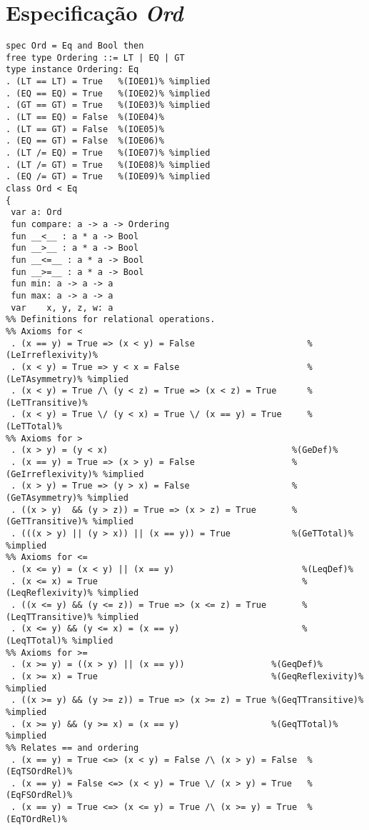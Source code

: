 \section{Especificação \textit{Ord}}
\label{appendix:strictSpec:ord}
\begin{Verbatim}
spec Ord = Eq and Bool then
free type Ordering ::= LT | EQ | GT
type instance Ordering: Eq
. (LT == LT) = True   %(IOE01)% %implied
. (EQ == EQ) = True   %(IOE02)% %implied
. (GT == GT) = True   %(IOE03)% %implied
. (LT == EQ) = False  %(IOE04)%
. (LT == GT) = False  %(IOE05)%
. (EQ == GT) = False  %(IOE06)%
. (LT /= EQ) = True   %(IOE07)% %implied
. (LT /= GT) = True   %(IOE08)% %implied
. (EQ /= GT) = True   %(IOE09)% %implied
class Ord < Eq
{
 var a: Ord
 fun compare: a -> a -> Ordering
 fun __<__ : a * a -> Bool
 fun __>__ : a * a -> Bool
 fun __<=__ : a * a -> Bool
 fun __>=__ : a * a -> Bool
 fun min: a -> a -> a
 fun max: a -> a -> a
 var    x, y, z, w: a
%% Definitions for relational operations.
%% Axioms for <
 . (x == y) = True => (x < y) = False                      %(LeIrreflexivity)%
 . (x < y) = True => y < x = False                         %(LeTAsymmetry)% %implied
 . (x < y) = True /\ (y < z) = True => (x < z) = True      %(LeTTransitive)%
 . (x < y) = True \/ (y < x) = True \/ (x == y) = True     %(LeTTotal)%
%% Axioms for >
 . (x > y) = (y < x)                                    %(GeDef)%
 . (x == y) = True => (x > y) = False                   %(GeIrreflexivity)% %implied
 . (x > y) = True => (y > x) = False                    %(GeTAsymmetry)% %implied
 . ((x > y)  && (y > z)) = True => (x > z) = True       %(GeTTransitive)% %implied
 . (((x > y) || (y > x)) || (x == y)) = True            %(GeTTotal)% %implied 
%% Axioms for <=
 . (x <= y) = (x < y) || (x == y)                         %(LeqDef)%
 . (x <= x) = True                                        %(LeqReflexivity)% %implied
 . ((x <= y) && (y <= z)) = True => (x <= z) = True       %(LeqTTransitive)% %implied
 . (x <= y) && (y <= x) = (x == y)                        %(LeqTTotal)% %implied
%% Axioms for >=
 . (x >= y) = ((x > y) || (x == y))                 %(GeqDef)%
 . (x >= x) = True                                  %(GeqReflexivity)% %implied 
 . ((x >= y) && (y >= z)) = True => (x >= z) = True %(GeqTTransitive)% %implied
 . (x >= y) && (y >= x) = (x == y)                  %(GeqTTotal)% %implied
%% Relates == and ordering
 . (x == y) = True <=> (x < y) = False /\ (x > y) = False  %(EqTSOrdRel)%
 . (x == y) = False <=> (x < y) = True \/ (x > y) = True   %(EqFSOrdRel)%
 . (x == y) = True <=> (x <= y) = True /\ (x >= y) = True  %(EqTOrdRel)%

\end{Verbatim}
